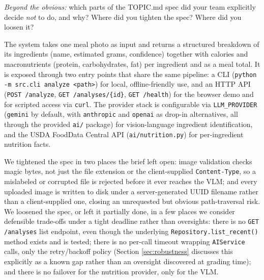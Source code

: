 \documentclass[11pt,a4paper]{article}
\newenvironment{probebox}{\begin{probeboxshown}}{\end{probeboxshown}}
\newenvironment{probebox}{\setbox0\vbox\bgroup}{\egroup\ignorespacesafterend}
\begin{document}
\begin{probebox}
\textit{Beyond the obvious:} which parts of the TOPIC.md spec did your team explicitly decide \emph{not} to do, and why? Where did you tighten the spec? Where did you loosen it?
\end{probebox}

\par\noindent
The system takes one meal photo as input and returns a structured breakdown
of its ingredients (name, estimated grams, confidence) together with
calories and macronutrients (protein, carbohydrates, fat) per ingredient and
as a meal total. It is exposed through two entry points that share the same
pipeline: a CLI (\texttt{python -m src.cli analyze <path>}) for local,
offline-friendly use, and an HTTP API (\texttt{POST /analyze},
\texttt{GET~/analyses/\{id\}}, \texttt{GET~/health}) for the browser demo
and for scripted access via \texttt{curl}. The provider stack is
configurable via \texttt{LLM\_PROVIDER} (\texttt{gemini} by default, with
\texttt{anthropic} and \texttt{openai} as drop-in alternatives, all through
the provided \texttt{ai/} package) for vision-language ingredient
identification, and the USDA FoodData Central API (\texttt{ai/nutrition.py})
for per-ingredient nutrition facts.

\par\noindent
We tightened the spec in two places the brief left open: image validation
checks magic bytes, not just the file extension or the client-supplied
\texttt{Content-Type}, so a mislabeled or corrupted file is rejected before
it ever reaches the VLM; and every uploaded image is written to disk under a
server-generated UUID filename rather than a client-supplied one, closing an
unrequested but obvious path-traversal risk. We loosened the spec, or left
it partially done, in a few places we consider defensible trade-offs under a
tight deadline rather than oversights: there is no \texttt{GET /analyses}
list endpoint, even though the underlying \texttt{Repository.list\_recent()}
method exists and is tested; there is no per-call timeout wrapping
\texttt{AIService} calls, only the retry/backoff policy (Section
\ref{sec:robustness} discusses this explicitly as a known gap rather than an
oversight discovered at grading time); and there is no failover for the
nutrition provider, only for the VLM.
\end{document}
